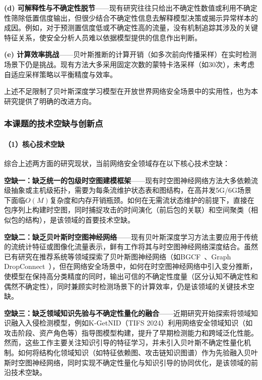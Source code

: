 \textbf{(d) 可解释性与不确定性脱节}——现有研究往往只给出不确定性数值或利用不确定性筛除低置信度输出，但很少结合不确定性信息去解释模型决策或揭示异常样本的成因。例如，对于预测置信度低或不确定性高的流量，没有机制追踪其涉及的关键特征关系，使安全分析人员难以依据模型提供的信息作出判断。

\textbf{(e) 计算效率挑战}——贝叶斯推断的计算开销（如多次前向传播采样）在实时检测场景下仍是挑战。现有方法大多采用固定次数的蒙特卡洛采样（如30次），未考虑自适应采样策略以平衡精度与效率。

上述不足限制了贝叶斯深度学习模型在开放世界网络安全场景中的实用性，也为本研究提供了明确的改进方向。


\subsubsection{本课题的技术空缺与创新点}

\paragraph{（1）核心技术空缺}


综合上述两方面的研究现状，当前网络安全领域存在以下核心技术空缺：

\textbf{空缺一：缺乏统一的包级时空图建模框架}——现有时空图神经网络方法大多依赖流级抽象或主机级拓扑，需要为每条流维护状态表和图结构，在高并发5G/6G场景下面临$O(M)$复杂度和内存开销瓶颈。如何在无需流状态维护的前提下，直接在包序列上构建时空图，同时捕捉攻击的时间演化（前后包的关联）和空间聚类（相似包的结构），是该领域的首要技术空缺。

\textbf{空缺二：缺乏贝叶斯时空图神经网络}——现有贝叶斯深度学习方法主要应用于传统的流统计特征或图像化流量表示，鲜有工作将其与时空图神经网络深度结合。虽然已有研究在推荐系统等领域探索了贝叶斯图神经网络（如BGCF~\cite{Sun2020}、Graph DropConnect~\cite{Hasanzadeh2020GDC}），但在网络安全场景中，如何在时空图神经网络中引入变分推断，使模型在保持高分类精度的同时，输出可信的不确定性度量（区分认知不确定性和偶然不确定性），同时兼顾实时检测场景下的计算效率，仍是该领域的关键技术空缺。

\textbf{空缺三：缺乏领域知识先验与不确定性量化的融合}——近期研究开始探索将领域知识融入入侵检测模型，例如K-GetNID（TIFS 2024）利用网络安全领域知识（如攻击阶段、资产角色等）指导图模型构建，提升了早期检测能力和跨域泛化性能。然而，这些工作主要关注知识引导的特征学习，并未引入贝叶斯不确定性量化机制。如何将结构化领域知识（如特征依赖图、攻击链知识图谱）作为先验融入贝叶斯时空图神经网络，同时实现不确定性量化与知识引导的协同优化，是该领域的前沿技术空缺。

